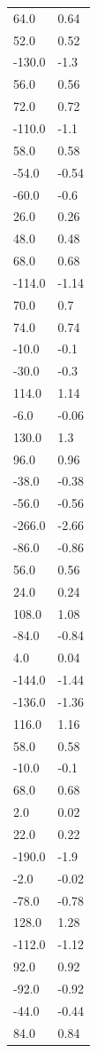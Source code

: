 \begin{longtable}{ll}
64.0 & 0.64 \\
52.0 & 0.52 \\
-130.0 & -1.3 \\
56.0 & 0.56 \\
72.0 & 0.72 \\
-110.0 & -1.1 \\
58.0 & 0.58 \\
-54.0 & -0.54 \\
-60.0 & -0.6 \\
26.0 & 0.26 \\
48.0 & 0.48 \\
68.0 & 0.68 \\
-114.0 & -1.14 \\
70.0 & 0.7 \\
74.0 & 0.74 \\
-10.0 & -0.1 \\
-30.0 & -0.3 \\
114.0 & 1.14 \\
-6.0 & -0.06 \\
130.0 & 1.3 \\
96.0 & 0.96 \\
-38.0 & -0.38 \\
-56.0 & -0.56 \\
-266.0 & -2.66 \\
-86.0 & -0.86 \\
56.0 & 0.56 \\
24.0 & 0.24 \\
108.0 & 1.08 \\
-84.0 & -0.84 \\
4.0 & 0.04 \\
-144.0 & -1.44 \\
-136.0 & -1.36 \\
116.0 & 1.16 \\
58.0 & 0.58 \\
-10.0 & -0.1 \\
68.0 & 0.68 \\
2.0 & 0.02 \\
22.0 & 0.22 \\
-190.0 & -1.9 \\
-2.0 & -0.02 \\
-78.0 & -0.78 \\
128.0 & 1.28 \\
-112.0 & -1.12 \\
92.0 & 0.92 \\
-92.0 & -0.92 \\
-44.0 & -0.44 \\
84.0 & 0.84 \\

\end{longtable}

